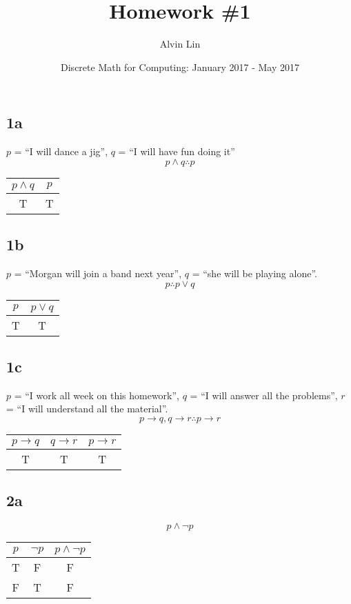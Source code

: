 \documentclass{math}
\title{Homework \#1}
\author{Alvin Lin}
\date{Discrete Math for Computing: January 2017 - May 2017}
\begin{document}
\maketitle

\subsection*{1a}
\( p \) = ``I will dance a jig'', \( q \) = ``I will have fun doing it''
\[ p \wedge q \therefore p \]
\begin{center}
  \begin{tabular}{|c|c|}
    \hline
    \( p \wedge q \) & \( p \) \\ \hline
    T                & T       \\ \hline
  \end{tabular}
\end{center}

\subsection*{1b}
\( p \) = ``Morgan will join a band next year'', \( q \) = ``she will be
playing alone''.
\[ p \therefore p \vee q \]
\begin{center}
  \begin{tabular}{|c|c|}
    \hline
    \( p \) & \( p \vee q \) \\ \hline
    T       & T              \\ \hline
  \end{tabular}
\end{center}

\subsection*{1c}
\( p \) = ``I work all week on this homework'', \( q \) = ``I will answer all
the problems'', \( r \) = ``I will understand all the material''.
\[ p \to q, q \to r \therefore p \to r \]
\begin{center}
  \begin{tabular}{|c|c|c|}
    \hline
    \( p \to q \) & \( q \to r \) & \( p \to r \) \\ \hline
    T             & T              & T            \\ \hline
  \end{tabular}
\end{center}

\subsection*{2a}
\[ p \wedge \neg{p} \]
\begin{center}
  \begin{tabular}{|c|c|c|}
    \hline
    \( p \) & \( \neg{p} \) & \( p \wedge \neg{p} \) \\ \hline
    T       & F             & F                      \\ \hline
    F       & T             & F                      \\ \hline
  \end{tabular}
\end{center}
\end{document}
